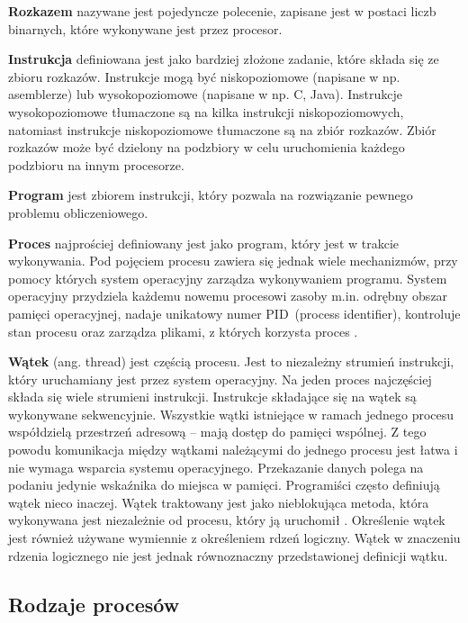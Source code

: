 \documentclass[12pt]{article}
\begin{document}
\textbf{Rozkazem} nazywane jest pojedyncze polecenie, zapisane jest w postaci liczb binarnych, które
wykonywane jest przez procesor.

\textbf{Instrukcja} definiowana jest jako bardziej złożone zadanie, które składa się ze zbioru rozkazów. Instrukcje
mogą być niskopoziomowe (napisane w np. asemblerze) lub wysokopoziomowe (napisane w np. C, Java).
Instrukcje wysokopoziomowe tłumaczone są na kilka instrukcji niskopoziomowych, natomiast instrukcje
niskopoziomowe tłumaczone są na zbiór rozkazów. Zbiór rozkazów może być dzielony na podzbiory w celu
uruchomienia każdego podzbioru na innym procesorze.

\textbf{Program} jest zbiorem instrukcji, który pozwala na rozwiązanie pewnego problemu obliczeniowego. 

\textbf{Proces} najprościej definiowany jest jako program, który jest w trakcie wykonywania. Pod pojęciem procesu zawiera
się jednak wiele mechanizmów, przy pomocy których system operacyjny zarządza wykonywaniem programu.
System operacyjny przydziela każdemu nowemu procesowi zasoby m.in. odrębny obszar pamięci operacyjnej, nadaje
unikatowy numer PID~(process identifier), kontroluje stan procesu oraz zarządza plikami, z których korzysta proces \cite{programowanie-rozproszone-i-rownolegle}.

\textbf{Wątek} (ang. thread) jest częścią procesu. Jest to niezależny strumień instrukcji, który uruchamiany jest przez system operacyjny.
Na jeden proces najczęściej składa się wiele strumieni instrukcji. Instrukcje składające się na wątek są wykonywane sekwencyjnie.
Wszystkie wątki istniejące w ramach jednego procesu współdzielą przestrzeń adresową -- mają dostęp do pamięci wspólnej.
Z tego powodu komunikacja między wątkami należącymi do jednego procesu jest łatwa i nie wymaga wsparcia systemu operacyjnego.
Przekazanie danych polega na podaniu jedynie wskaźnika do miejsca w pamięci.
Programiści często definiują wątek nieco inaczej. Wątek traktowany jest jako nieblokująca metoda, która wykonywana jest
niezależnie od procesu, który ją uruchomił \cite{programowanie-rozproszone-i-rownolegle}. Określenie wątek jest również używane
wymiennie z określeniem rdzeń logiczny. Wątek w znaczeniu rdzenia logicznego nie jest jednak równoznaczny przedstawionej definicji wątku.

\subsection{Rodzaje procesów}
\end{document}
